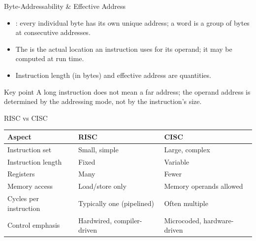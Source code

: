 \documentclass[aspectratio=169]{beamer}
\begin{document}
\begin{frame}{Byte-Addressability \& Effective Address}
  \begin{itemize}
    \item {}: every individual byte has its own
      unique address; a word is a group of bytes at consecutive addresses.
    \item The  is the actual location an instruction
      uses for its operand; it may be computed at run time.
    \item Instruction length (in bytes) and effective address are
       quantities.
  \end{itemize}
  \begin{block}{Key point}
    A long instruction does not mean a far address; the operand address is
    determined by the addressing mode, not by the instruction's size.
  \end{block}
\end{frame}

\begin{frame}{RISC vs CISC}
  \begin{center}
    \begin{tabular}{lll}
      \toprule
      \textbf{Aspect} & \textbf{RISC} & \textbf{CISC} \\
      \midrule
      Instruction set & Small, simple & Large, complex \\
      Instruction length & Fixed & Variable \\
      Registers & Many & Fewer \\
      Memory access & Load/store only & Memory operands allowed \\
      Cycles per instruction & Typically one (pipelined) & Often multiple \\
      Control emphasis & Hardwired, compiler-driven & Microcoded, hardware-driven \\
      \bottomrule
    \end{tabular}
  \end{center}
  \vspace{0.2cm}
\end{frame}
\end{document}
